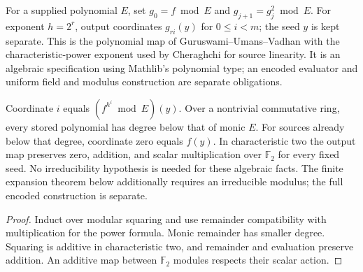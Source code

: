 \begin{definition}
  \label{def:lowerbounds-algebraic-polynomial-condenser}
  \leanok
  For a supplied polynomial $E$, set $g_0=f\bmod E$ and
  $g_{j+1}=g_j^2\bmod E$. For exponent $h=2^r$, output coordinates
  $g_{ri}(y)$ for $0\le i<m$; the seed $y$ is kept separate.
  This is the polynomial map of Guruswami--Umans--Vadhan with the
  characteristic-power exponent used by Cheraghchi for source linearity.
  It is an algebraic specification using Mathlib's polynomial type;
  an encoded evaluator and uniform field and modulus construction
  are separate obligations.
\end{definition}

\begin{theorem}
  \label{thm:lowerbounds-algebraic-polynomial-condenser}
  \leanok
  Coordinate $i$ equals $(f^{h^i}\bmod E)(y)$. Over a nontrivial
  commutative ring, every stored polynomial has degree below that of
  monic $E$. For sources already below that degree, coordinate zero
  equals $f(y)$. In characteristic two the output map preserves zero,
  addition, and scalar multiplication over $\mathbb F_2$ for every
  fixed seed. No irreducibility hypothesis is needed for these algebraic
  facts. The finite expansion theorem below additionally requires an
  irreducible modulus; the full encoded construction is separate.
\end{theorem}
\begin{proof}
  \leanok
  Induct over modular squaring and use remainder compatibility with
  multiplication for the power formula. Monic remainder has smaller
  degree. Squaring is additive in characteristic two, and remainder
  and evaluation preserve addition. An additive map between
  $\mathbb F_2$ modules respects their scalar action.
\end{proof}

